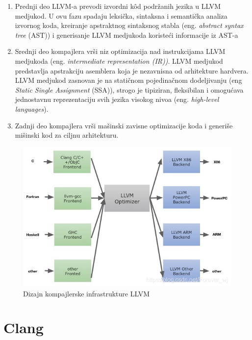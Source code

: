 \documentclass[12pt,oneside]{memoir}
\begin{document}
\begin{enumerate}
  \item Prednji deo LLVM-a prevodi izvordni k\^od podr\v{z}anih jezika u LLVM medjukod. U ovu fazu spadaju leksi\v{c}ka, sintaksna i semanti\v{c}ka analiza
  izvornog koda, kreiranje apstraktnog sintaksnog stabla (eng. \textit{abstract syntax tree} (AST)) i generisanje LLVM medjukoda koriste\'{c}i informacije iz AST-a
  \item{Srednji deo kompajlera vr\v{s}i niz optimizacija nad instrukcijama LLVM medjukoda (eng. \textit{intermediate representation (IR))}. LLVM medjukod predstavlja apstrakciju asemblera koja je nezavnisna od arhitekture hardvera. LLVM medjukod zasnovan je na stati\v{c}nom pojedina\v{c}nom dodeljivanju (eng \textit{Static Single Assignment} (SSA)), strogo je tipiziran, fleksibilan i omogu\'{c}ava jednostavnu reprezentaciju svih jezika visokog nivoa (eng. \textit{high-level languages}).}
  \item{Zadnji deo kompajlera vr\v{s}i ma\v{s}inski zavisne optimizacije koda i generi\v{s}e mi\v{s}inski kod za ciljnu arhitekturu.}
\end{enumerate}

\begin{figure}[!h]
\begin{center}
\includegraphics[scale=0.4]{llvmDesign.jpg}
\end{center}
\caption{Dizajn kompajlerske infrastrukture LLVM}
\label{fig:exploded}
\end{figure}

\section{Clang}
\end{document}
